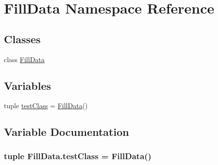 \hypertarget{namespace_fill_data}{\section{Fill\-Data Namespace Reference}
\label{namespace_fill_data}
}
\subsection*{Classes}
\begin{DoxyCompactItemize}
\item 
class \hyperlink{class_fill_data_1_1_fill_data}{Fill\-Data}
\end{DoxyCompactItemize}
\subsection*{Variables}
\begin{DoxyCompactItemize}
\item 
tuple \hyperlink{namespace_fill_data_ab69e8f6937689a4281630e00dceb3bbd}{test\-Class} = \hyperlink{class_fill_data_1_1_fill_data}{Fill\-Data}()
\end{DoxyCompactItemize}


\subsection{Variable Documentation}
\hypertarget{namespace_fill_data_ab69e8f6937689a4281630e00dceb3bbd}{
\subsubsection[{test\-Class}]{\setlength{\rightskip}{0pt plus 5cm}tuple {\bf Fill\-Data.\-test\-Class} = {\bf Fill\-Data}()}}\label{namespace_fill_data_ab69e8f6937689a4281630e00dceb3bbd}
